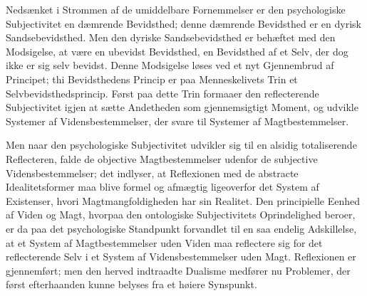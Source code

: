 \documentclass[11pt]{book}
\newcommand{\opage}[1]{\marginnote{\footnotesize\textit{[#1]}}}
\begin{document}
Nedsænket i Strommen af de umiddelbare Fornemmelser er den psychologiske
Subjectivitet en dæmrende Bevidsthed; denne dæmrende Bevidsthed er en dyrisk
Sandsebevidsthed. Men den dyriske Sandsebevidsthed er behæftet med den
Modsigelse, at være en ubevidst Bevidsthed, en Bevidsthed af et Selv, der dog
ikke er sig selv bevidst. Denne Modsigelse løses ved et nyt Gjennembrud af
Principet; thi Bevidsthedens Princip er paa Menneskelivets Trin et
Selvbevidsthedsprincip. Først paa dette Trin formaaer den reflecterende
Subjectivitet
\opage{133} \setcounter{footnote}{0}%
igjen at sætte Andetheden som gjennemsigtigt Moment, og udvikle Systemer
af Vidensbestemmelser, der svare til Systemer af Magtbestemmelser.

Men naar den psychologiske Subjectivitet udvikler sig til en alsidig
totaliserende Reflecteren, falde de objective Magtbestemmelser udenfor de
subjective Vidensbestemmelser; det indlyser, at Reflexionen med de
abstracte Idealitetsformer maa blive formel og afmægtig ligeoverfor det
System af Existenser, hvori Magtmangfoldigheden har sin Realitet. Den
principielle Eenhed af Viden og Magt, hvorpaa den ontologiske
Subjectivitets Oprindelighed beroer, er da paa det psychologiske
Standpunkt forvandlet til en saa endelig Adskillelse, at et System af
Magtbestemmelser uden Viden maa reflectere sig for det reflecterende Selv
i et System af Vidensbestemmelser uden Magt. Reflexionen er gjennemført;
men den herved indtraadte Dualisme medfører nu Problemer, der først
efterhaanden kunne belyses fra et høiere Synspunkt.
\end{document}
